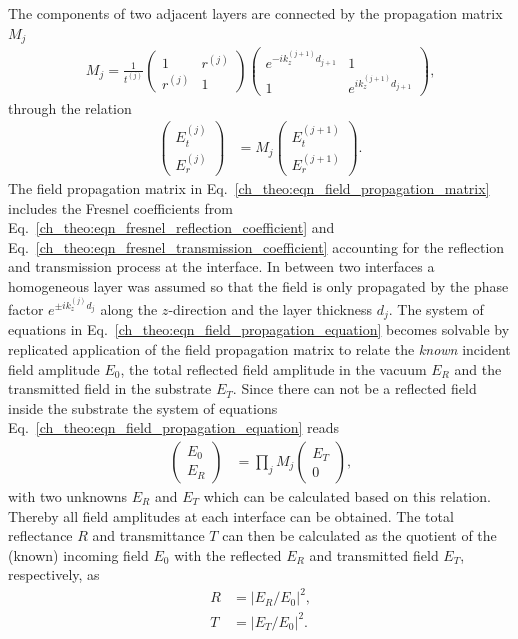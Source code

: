 The components of two adjacent layers are connected by the propagation matrix $M_j$
\begin{align}
M_j = \frac{1}{t^{(j)}}
\begin{pmatrix}
1 & r^{(j)} \\
r^{(j)} & 1
\end{pmatrix}
\begin{pmatrix}
e^{-i k_z^{(j+1)} d_{j+1}} & 1 \\
1 & e^{i k_z^{(j+1)} d_{j+1}}
\end{pmatrix}
\text{,} \label{ch_theo:eqn_field_propagation_matrix}
\end{align}
through the relation
\begin{align}
\begin{pmatrix}
E^{(j)}_t \\
E^{(j)}_r
\end{pmatrix} &=
M_j
\begin{pmatrix}
E^{(j+1)}_t \\
E^{(j+1)}_r
\end{pmatrix} \text{.} \label{ch_theo:eqn_field_propagation_equation}
\end{align}
The field propagation matrix in Eq.~\eqref{ch_theo:eqn_field_propagation_matrix} includes the Fresnel coefficients from Eq.~\eqref{ch_theo:eqn_fresnel_reflection_coefficient} and Eq.~\eqref{ch_theo:eqn_fresnel_transmission_coefficient} accounting for the reflection and transmission process at the interface. In between two interfaces a homogeneous layer was assumed so that the field is only propagated by the phase factor $e^{\pm i k_z^{(j)} d_{j}}$ along the $z$-direction and the layer thickness $d_j$. The system of equations in Eq.~\eqref{ch_theo:eqn_field_propagation_equation} becomes solvable by replicated application of the field propagation matrix to relate the \emph{known} incident field amplitude $E_0$, the total reflected field amplitude in the vacuum $E_R$ and the transmitted field in the substrate $E_T$. Since there can not be a reflected field inside the substrate the system of equations Eq.~\eqref{ch_theo:eqn_field_propagation_equation} reads
\begin{align}
\begin{pmatrix}
E_0 \\
E_R
\end{pmatrix} &=
\prod\limits_{j} M_j
\begin{pmatrix}
E_T \\
0
\end{pmatrix} \text{,} \label{eqn:field_propagation_equation}
\end{align}
with two unknowns $E_R$ and $E_T$ which can be calculated based on this relation. Thereby all field amplitudes at each interface can be obtained. The total reflectance $R$ and transmittance $T$ can then be calculated as the quotient of the (known) incoming field $E_0$ with the reflected $E_R$ and transmitted field $E_T$, respectively, as
\begin{align}
R &= |E_R/E_0|^2\text{,} \nonumber\\
T &= |E_T/E_0|^2 \text{.} \label{eqn:refl_trans}
\end{align}

